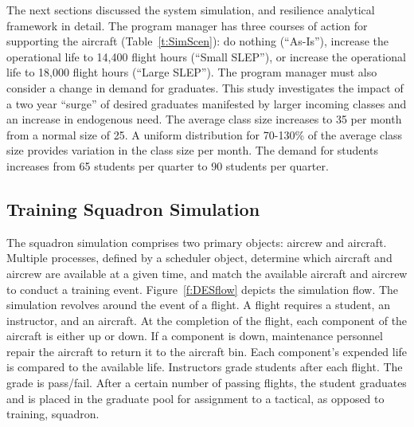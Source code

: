 \documentclass[preprint,12pt]{elsarticle}
\begin{document}
The next sections discussed the system simulation, and resilience
analytical framework in detail. The program manager has three courses of action
for supporting the aircraft (Table~\ref{t:SimScen}): do nothing
(``As-Is''), increase the operational life to 14,400 flight hours
(``Small SLEP''), or increase the operational life to 18,000 flight
hours (``Large SLEP''). The program manager must also consider a
change in demand for graduates. This study investigates the impact of
a two year ``surge'' of desired graduates manifested by larger
incoming classes and an increase in endogenous need. The average class
size increases to 35 per month from a normal size of 25. A uniform
distribution for 70-130\% of the average class size 
provides variation in the class size per month. The demand
for students increases from 65 students per quarter to 90 students per
quarter. 


\subsection{Training Squadron Simulation}

The squadron simulation comprises two primary objects: aircrew and
aircraft. Multiple processes, defined by a scheduler object, determine
which aircraft and aircrew are available at a given time, and match
the available aircraft and aircrew to conduct a training event. 
Figure~\ref{f:DESflow} depicts the simulation flow. The simulation
revolves around the event of a flight.  A flight requires a student,
an instructor, and an aircraft. At the completion of the flight, each
component of the aircraft is either up or down. If a component is
down, maintenance personnel repair the aircraft to return it to the
aircraft bin. Each component's expended life is compared to the
available life. Instructors grade students after each flight. The
grade is pass/fail. After a certain number of passing flights, the
student graduates and is placed in the graduate pool for assignment to
a tactical, as opposed to training, squadron.
\end{document}
